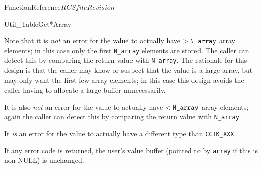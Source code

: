 \begin{cactuspart}{FunctionReference}{$RCSfile$}{$Revision$}
\begin{FunctionDescription}{Util\_TableGet*Array}
\begin{Discussion}
Note that it is {\em not\/} an error for the value to actually have
$> \verb|N_array|$ array elements; in this case only the first \verb|N_array|
elements are stored.  The caller can detect this by comparing the
return value with \verb|N_array|.
The rationale for this design is that the caller may know or suspect
that the value is a large array, but may only want the first few array
elements; in this case this design avoids the caller having to allocate
a large buffer unnecessarily.

It is also {\em not\/} an error for the value to actually have
$< \verb|N_array|$ array elements; again the caller can detect this by
comparing the return value with \verb|N_array|.

It {\em is\/} an error for the value to actually have a different type
than \verb|CCTK_XXX|.

If any error code is returned, the user's value buffer
(pointed to by \verb|array| if this is non-NULL) is unchanged.
\end{Discussion}


\end{FunctionDescription}
\end{cactuspart}
